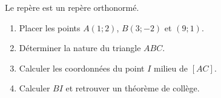 
Le repère \Oij est un repère orthonormé.
\begin{enumerate}
\item Placer les points $A(1;2)$, $B(3;-2)$ et $(9;1)$.
\item Déterminer la nature du triangle $ABC$.
\item Calculer les coordonnées du point $I$ milieu de $[AC]$.
\item Calculer $BI$ et retrouver un théorème de collège.
\end{enumerate}